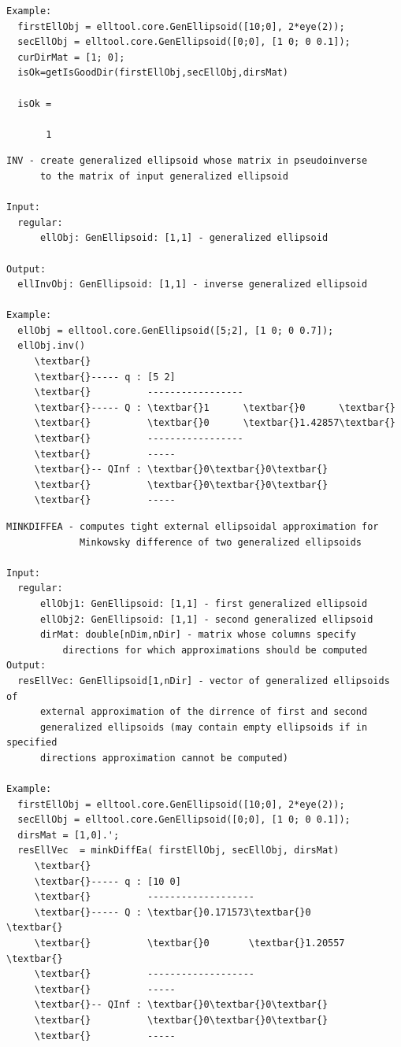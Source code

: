 \documentclass[letterpaper,10pt,english]{sphinxmanual}
\begin{document}
\begin{Verbatim}[commandchars=\\\{\}]
Example:
  firstEllObj = elltool.core.GenEllipsoid([10;0], 2*eye(2));
  secEllObj = elltool.core.GenEllipsoid([0;0], [1 0; 0 0.1]);
  curDirMat = [1; 0];
  isOk=getIsGoodDir(firstEllObj,secEllObj,dirsMat)

  isOk =

       1
\end{Verbatim}

\begin{Verbatim}[commandchars=\\\{\}]
INV - create generalized ellipsoid whose matrix in pseudoinverse
      to the matrix of input generalized ellipsoid

Input:
  regular:
      ellObj: GenEllipsoid: [1,1] - generalized ellipsoid

Output:
  ellInvObj: GenEllipsoid: [1,1] - inverse generalized ellipsoid

Example:
  ellObj = elltool.core.GenEllipsoid([5;2], [1 0; 0 0.7]);
  ellObj.inv()
     \textbar{}
     \textbar{}----- q : [5 2]
     \textbar{}          -----------------
     \textbar{}----- Q : \textbar{}1      \textbar{}0      \textbar{}
     \textbar{}          \textbar{}0      \textbar{}1.42857\textbar{}
     \textbar{}          -----------------
     \textbar{}          -----
     \textbar{}-- QInf : \textbar{}0\textbar{}0\textbar{}
     \textbar{}          \textbar{}0\textbar{}0\textbar{}
     \textbar{}          -----
\end{Verbatim}

\begin{Verbatim}[commandchars=\\\{\}]
MINKDIFFEA - computes tight external ellipsoidal approximation for
             Minkowsky difference of two generalized ellipsoids

Input:
  regular:
      ellObj1: GenEllipsoid: [1,1] - first generalized ellipsoid
      ellObj2: GenEllipsoid: [1,1] - second generalized ellipsoid
      dirMat: double[nDim,nDir] - matrix whose columns specify
          directions for which approximations should be computed
Output:
  resEllVec: GenEllipsoid[1,nDir] - vector of generalized ellipsoids of
      external approximation of the dirrence of first and second
      generalized ellipsoids (may contain empty ellipsoids if in specified
      directions approximation cannot be computed)

Example:
  firstEllObj = elltool.core.GenEllipsoid([10;0], 2*eye(2));
  secEllObj = elltool.core.GenEllipsoid([0;0], [1 0; 0 0.1]);
  dirsMat = [1,0].';
  resEllVec  = minkDiffEa( firstEllObj, secEllObj, dirsMat)
     \textbar{}
     \textbar{}----- q : [10 0]
     \textbar{}          -------------------
     \textbar{}----- Q : \textbar{}0.171573\textbar{}0       \textbar{}
     \textbar{}          \textbar{}0       \textbar{}1.20557 \textbar{}
     \textbar{}          -------------------
     \textbar{}          -----
     \textbar{}-- QInf : \textbar{}0\textbar{}0\textbar{}
     \textbar{}          \textbar{}0\textbar{}0\textbar{}
     \textbar{}          -----
\end{Verbatim}
\end{document}

